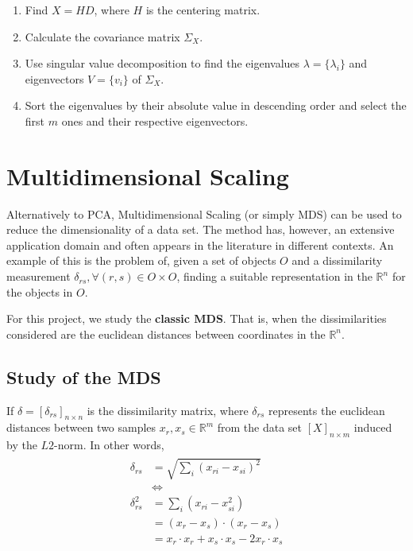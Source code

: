 \documentclass[12pt]{report}
\begin{document}
\begin{enumerate}
	\item Find $X=HD$, where $H$ is the centering matrix.

	\item Calculate the covariance matrix $\Sigma_X$.

	\item Use singular value decomposition to find the eigenvalues $\lambda = \{\lambda_i\}$ and eigenvectors $V = \{v_i\}$ of $\Sigma_X$.

	\item Sort the eigenvalues by their absolute value in descending order and select the first $m$ ones and their respective eigenvectors.
\end{enumerate}

\section{Multidimensional Scaling}

Alternatively to PCA, Multidimensional Scaling (or simply MDS) can be used to reduce the dimensionality of a data set. The method has, however, an extensive application domain and often appears in the literature in different contexts. An example of this is the problem of, given a set of objects $O$ and a dissimilarity measurement $\delta_{rs}, \forall (r, s) \in O\times O$, finding a suitable representation in the $\mathbb{R}^n$ for the objects in $O$. \cite{cox2001}

For this project, we study the \textbf{classic MDS}. That is, when the dissimilarities considered are the euclidean distances between coordinates in the $\mathbb{R}^n$.

\subsection{Study of the MDS}

If $\delta = [\delta_{rs}]_{n\times n}$ is the dissimilarity matrix, where $\delta_{rs}$ represents the euclidean distances between two samples $x_r, x_s\in \mathbb{R}^m$ from the data set $[X]_{n\times m}$ induced by the $L2$-norm. In other words,
\begin{align}
\label{eq:basemds}
\begin{split}
  \delta_{rs}  &= \sqrt{\sum_i (x_{ri}-x_{si})^2} \\
  &\iff \\
  \delta_{rs}^2 &= \sum_i (x_{ri}-x_{si}^2) \\
  &= (x_r-x_s)\cdot (x_r-x_s) \\
  &= x_r\cdot x_r + x_s\cdot x_s -2x_r\cdot x_s
\end{split}
\end{align}
\end{document}
